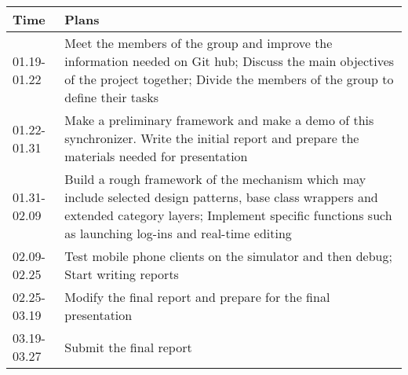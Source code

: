 

\begin{longtable}{lp{10cm}}


Time        & Plans  \\                                                          
\hline
01.19-01.22 & Meet the members of the group and improve the information needed on Git hub; Discuss the main objectives of the project together; Divide the members of the group to define their tasks  \\
01.22-01.31 & Make a preliminary framework and make a demo of this synchronizer. Write the initial report and prepare the materials needed for presentation         \\       
01.31-02.09 & Build a rough framework of the mechanism which may include selected design patterns, base class wrappers and extended category layers; Implement specific functions such as launching log-ins and real-time editing                                    \\
02.09-02.25 & Test mobile phone clients on the simulator and then debug; Start writing reports                                                                                                                                          \\
02.25-03.19 & Modify the final report and prepare for the final presentation                                                                                                                  \\
03.19-03.27 & Submit the final report     \\                                              
\hline

\end{longtable}

   
